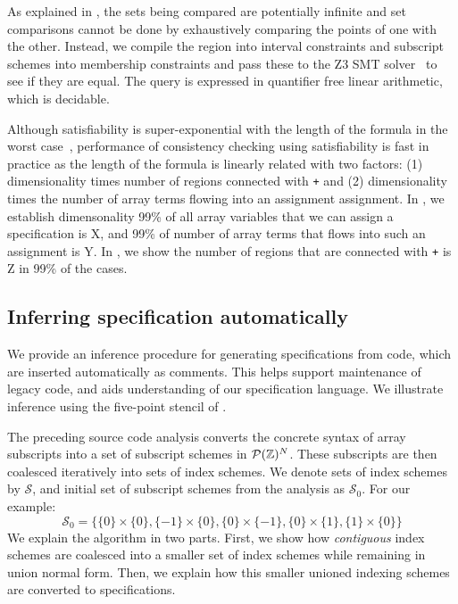 As explained in , the sets being compared are
potentially infinite and set comparisons cannot be done by exhaustively
comparing the points of one with the other. Instead, we compile the region into
interval constraints and subscript schemes into membership constraints and pass
these to the \textsc{Z3} SMT solver~\citep{de2008z3} to see if they are equal. The
query is expressed in quantifier free linear arithmetic, which is decidable.

Although satisfiability is super-exponential with the length of the formula in
the worst case~\cite{fischer1974super}, performance of consistency checking
using satisfiability is fast in practice as the length of the formula is linearly
related with two factors: (1) dimensionality times number of regions connected
with \texttt{+} and (2) dimensionality times the number of array terms flowing
into an assignment assignment. In , we establish dimensonality
99\% of all array variables that we can assign a specification is X, and 99\% of
number of array terms that flows into such an assignment is Y. In
, we show the number of regions that are connected with
\texttt{+} is Z in 99\% of the cases.


\subsection{Inferring specification automatically}
\label{subsec:inference}
%
\noindent
We provide an inference procedure for generating specifications from
code, which are inserted automatically as comments. This helps support
maintenance of legacy code, and aids understanding of our
specification language. We illustrate inference using the
five-point stencil of .

The preceding source code analysis converts the concrete syntax of
array subscripts into a set of subscript schemes in
$\mathcal{P}(\textnormal{$\mathbb{Z}$})^N$. These subscripts are then coalesced iteratively
into sets of index schemes. We denote sets of index schemes by
$\mathcal{S}$, and initial set of subscript schemes from the analysis
as $\mathcal{S}_0$. For our example:
%
\begin{equation*}
\mathcal{S}_0 = \{\{0\} \times \{0\}, \{-1\} \times \{0\},
\{0\} \times \{-1\}, \{0\} \times \{1\}, \{1\} \times \{0\}\}
\end{equation*}
%
%
We explain the algorithm in two parts. First, we show how
\emph{contiguous} index schemes are coalesced into a smaller set of
index schemes while remaining in union normal form. Then, we explain
how this smaller unioned indexing schemes are converted to
specifications.

